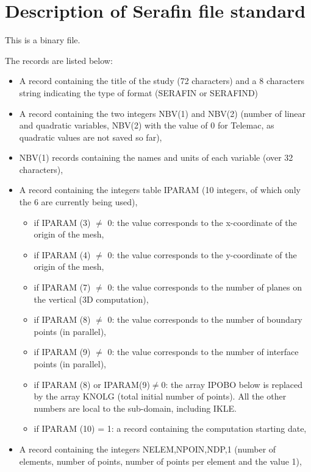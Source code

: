  \chapter {Description of Serafin file standard}
\label{tel2d:app3}
 This is a binary file.

 The records are listed below:

\begin{itemize}
\item  A record containing the title of the study (72 characters) and a 8 characters string indicating the type of format (SERAFIN or SERAFIND)

\item  A record containing the two integers NBV(1) and NBV(2) (number of linear and quadratic variables, NBV(2) with the value of 0 for Telemac, as quadratic values are not saved so far),

\item  NBV(1) records containing the names and units of each variable (over 32 characters),

\item  A record containing the integers table IPARAM (10 integers, of which only the 6 are currently being used),
\begin{itemize}
\item  if IPARAM (3) $\neq$ 0: the value corresponds to the x-coordinate of the origin of the mesh,

\item  if IPARAM (4) $\neq$ 0: the value corresponds to the y-coordinate of the origin of the mesh,

\item  if IPARAM (7) $\neq$ 0: the value corresponds to the number of  planes on the vertical (3D computation),

\item  if IPARAM (8) $\neq$ 0: the value corresponds to the number of boundary points (in parallel),

\item  if IPARAM (9) $\neq$ 0: the value corresponds to the number of interface points (in parallel),

\item  if IPARAM (8) or IPARAM(9)$\neq$0: the array IPOBO below is replaced by the array KNOLG (total initial number of points). All the other numbers are local to the sub-domain, including IKLE.

\item  if IPARAM (10) = 1: a record containing the computation starting date,
\end{itemize}
\item  A record containing the integers NELEM,NPOIN,NDP,1 (number of elements, number of points, number of points per element and the value 1),


\end{itemize}
